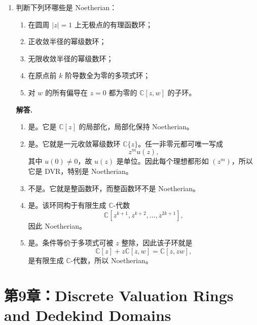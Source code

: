\documentclass[a4paper]{ctexart}
\begin{document}
\begin{enumerate}[leftmargin=*, label=\textbf{8.\arabic*.}]
因此在局部情形下 \(A\) 是有限 \(k\)-代数；直积回去仍有限，故一般情形也成立。

\setcounter{enumi}{3}
\item 判断下列环哪些是 Noetherian：
\begin{enumerate}[label=(\roman*)]
\item 在圆周 \(|z|=1\) 上无极点的有理函数环；
\item 正收敛半径的幂级数环；
\item 无限收敛半径的幂级数环；
\item 在原点前 \(k\) 阶导数全为零的多项式环；
\item 对 \(w\) 的所有偏导在 \(z=0\) 都为零的 \(\mathbb C[z,w]\) 的子环。
\end{enumerate}

\textbf{解答.}
\begin{enumerate}[label=(\roman*)]
\item 是。它是 \(\mathbb C[z]\) 的局部化，局部化保持 Noetherian。
\item 是。它就是一元收敛幂级数环 \(\mathbb C\{z\}\)。任一非零元都可唯一写成
\[
z^m u(z),
\]
其中 \(u(0)\neq 0\)，故 \(u(z)\) 是单位。因此每个理想都形如 \((z^m)\)，所以它是 DVR，特别是 Noetherian。
\item 不是。它就是整函数环，而整函数环不是 Noetherian。
\item 是。该环同构于有限生成 \(\mathbb C\)-代数
\[
\mathbb C[z^{k+1},z^{k+2},\dots,z^{2k+1}],
\]
因此 Noetherian。
\item 是。条件等价于多项式可被 \(z\) 整除，因此该子环就是
\[
\mathbb C[z]+z\mathbb C[z,w]=\mathbb C[z,zw],
\]
是有限生成 \(\mathbb C\)-代数，所以 Noetherian。
\end{enumerate}
\end{enumerate}

\section{第9章：Discrete Valuation Rings and Dedekind Domains}
\end{document}
